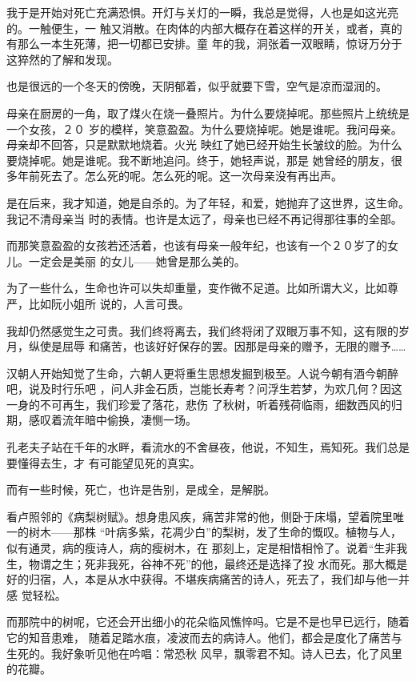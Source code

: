 \documentclass[12pt,a4paper]{article}
\begin{document}
		我于是开始对死亡充满恐惧。开灯与关灯的一瞬，我总是觉得，人也是如这光亮的。一触便生，一
	触又消散。在肉体的内部大概存在着这样的开关，或者，真的有那么一本生死薄，把一切都已安排。童
	年的我，洞张着一双眼睛，惊讶万分于这猝然的了解和发现。

		也是很远的一个冬天的傍晚，天阴郁着，似乎就要下雪，空气是凉而湿润的。

		母亲在厨房的一角，取了煤火在烧一叠照片。为什么要烧掉呢。那些照片上统统是一个女孩，２０
	岁的模样，笑意盈盈。为什么要烧掉呢。她是谁呢。我问母亲。母亲却不回答，只是默默地烧着。火光
	映红了她已经开始生长皱纹的脸。为什么要烧掉呢。她是谁呢。我不断地追问。终于，她轻声说，那是
	她曾经的朋友，很多年前死去了。怎么死的呢。怎么死的呢。这一次母亲没有再出声。

		是在后来，我才知道，她是自杀的。为了年轻，和爱，她抛弃了这世界，这生命。我记不清母亲当
	时的表情。也许是太远了，母亲也已经不再记得那往事的全部。

		而那笑意盈盈的女孩若还活着，也该有母亲一般年纪，也该有一个２０岁了的女儿。一定会是美丽
	的女儿——她曾是那么美的。

		为了一些什么，生命也许可以失却重量，变作微不足道。比如所谓大义，比如尊严，比如阮小姐所
	说的，人言可畏。

		我却仍然感觉生之可贵。我们终将离去，我们终将闭了双眼万事不知，这有限的岁月，纵使是屈辱
	和痛苦，也该好好保存的罢。因那是母亲的赠予，无限的赠予……

		汉朝人开始知觉了生命，六朝人更将重生思想发掘到极至。人说今朝有酒今朝醉吧，说及时行乐吧
	，问人非金石质，岂能长寿考？问浮生若梦，为欢几何？因这一身的不可再生，我们珍爱了落花，悲伤
	了秋树，听着残荷临雨，细数西风的归期，感叹着流年暗中偷换，凄恻一场。

		孔老夫子站在千年的水畔，看流水的不舍昼夜，他说，不知生，焉知死。我们总是要懂得去生，才
	有可能望见死的真实。

		而有一些时候，死亡，也许是告别，是成全，是解脱。

		看卢照邻的《病梨树赋》。想身患风疾，痛苦非常的他，侧卧于床塌，望着院里唯一的树木——那株
	“叶病多紫，花凋少白”的梨树，发了生命的慨叹。植物与人，似有通灵，病的瘦诗人，病的瘦树木，在
	那刻上，定是相惜相怜了。说着“生非我生，物谓之生；死非我死，谷神不死”的他，最终还是选择了投
	水而死。那大概是好的归宿，人，本是从水中获得。不堪疾病痛苦的诗人，死去了，我们却与他一并感
	觉轻松。

		而那院中的树呢，它还会开出细小的花朵临风憔悴吗。它是不是也早已远行，随着它的知音患难，
	随着足踏水痕，凌波而去的病诗人。他们，都会是度化了痛苦与生死的。我好象听见他在吟唱：常恐秋
	风早，飘零君不知。诗人已去，化了风里的花瓣。
\end{document}
